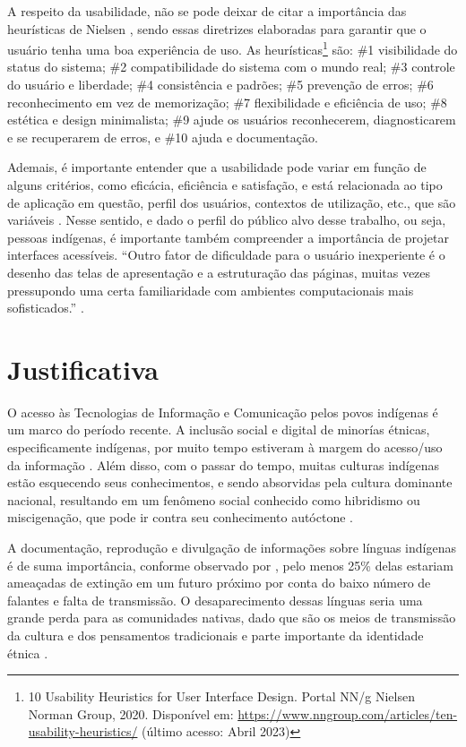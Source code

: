 A respeito da usabilidade, não se pode deixar de citar a importância das heurísticas de Nielsen \cite{nielsen1994}, sendo essas diretrizes elaboradas para garantir que o
usuário tenha uma boa experiência de uso. As heurísticas\footnote{10 Usability Heuristics for User Interface Design. Portal NN/g Nielsen Norman Group, 2020. Disponível
em: \url{https://www.nngroup.com/articles/ten-usability-heuristics/} (último acesso: Abril 2023)} são: \#1 visibilidade do status do sistema; \#2 compatibilidade do
sistema com o mundo real; \#3 controle do usuário e liberdade; \#4 consistência e padrões; \#5 prevenção de erros; \#6 reconhecimento em vez de memorização; \#7
flexibilidade e eficiência de uso; \#8 estética e design minimalista; \#9 ajude os usuários reconhecerem, diagnosticarem e se recuperarem de erros, e \#10 ajuda e
documentação.

Ademais, é importante entender que a usabilidade pode variar em função de alguns critérios, como eficácia, eficiência e satisfação, e está relacionada ao tipo de
aplicação em questão, perfil dos usuários, contextos de utilização, etc., que são variáveis \cite{winckler2022}. Nesse sentido, e dado o perfil do público alvo desse
trabalho, ou seja, pessoas indígenas, é importante também compreender a importância de projetar interfaces acessíveis. ``Outro fator de dificuldade para o usuário
inexperiente é o desenho das telas de apresentação e a estruturação das páginas, muitas vezes pressupondo uma certa familiaridade com ambientes computacionais mais
sofisticados.'' \cite{takashi2000}.

\section{Justificativa}
\label{sec:Justificativa}

O acesso às Tecnologias de Informação e Comunicação pelos povos indígenas é um marco do período recente. A inclusão social e digital de minorías étnicas, especificamente
indígenas, por muito tempo estiveram à margem do acesso/uso da informação \cite{pinto2010}. Além disso, com o passar do tempo, muitas culturas indígenas estão esquecendo
seus conhecimentos, e sendo absorvidas pela cultura dominante nacional, resultando em um fenômeno social conhecido como hibridismo ou miscigenação, que pode ir contra seu
conhecimento autóctone \cite{pinto2010}.

A documentação, reprodução e divulgação de informações sobre línguas indígenas é de suma importância, conforme observado por ,
pelo menos 25\% delas estariam ameaçadas de extinção em um futuro próximo por conta do baixo número de falantes e falta de transmissão. O desaparecimento dessas línguas
seria uma grande perda para as comunidades nativas, dado que são os meios de transmissão da cultura e dos pensamentos tradicionais e parte importante da identidade étnica
\cite{moore2008}.

